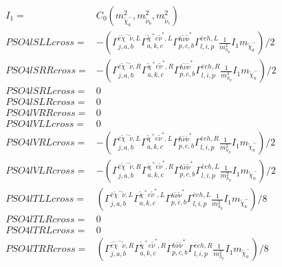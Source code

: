 \documentclass[A4,landscape]{article}
\begin{document}
\begin{align} 
I_1= & C_0(m^2_{\tilde{\chi}^-_{{a}}}, m^2_{\tilde{\nu}_{{b}}}, m^2_{\tilde{\nu}_{{c}}}) \\ 
  PSO4lSLLcross= & -( \Gamma^{\bar{e}\tilde{\chi}^- \tilde{\nu} ,L}_{j, a, b} \Gamma^{\tilde{\chi}^+e \tilde{\nu}^*,L}_{a, k, c} \Gamma^{h \tilde{\nu} \tilde{\nu}^*}_{p, c, b} \Gamma^{\bar{e}e h ,L}_{l, i, p} \frac{1}{m^2_{h_{{p}}}} I_1 m_{\tilde{\chi}^-_{{a}}})/2 \\ 
  PSO4lSRRcross= & -( \Gamma^{\bar{e}\tilde{\chi}^- \tilde{\nu} ,R}_{j, a, b} \Gamma^{\tilde{\chi}^+e \tilde{\nu}^*,R}_{a, k, c} \Gamma^{h \tilde{\nu} \tilde{\nu}^*}_{p, c, b} \Gamma^{\bar{e}e h ,R}_{l, i, p} \frac{1}{m^2_{h_{{p}}}} I_1 m_{\tilde{\chi}^-_{{a}}})/2 \\ 
  PSO4lSRLcross= & 0 \\ 
  PSO4lSLRcross= & 0 \\ 
  PSO4lVRRcross= & 0 \\ 
  PSO4lVLLcross= & 0 \\ 
  PSO4lVRLcross= & -( \Gamma^{\bar{e}\tilde{\chi}^- \tilde{\nu} ,L}_{j, a, b} \Gamma^{\tilde{\chi}^+e \tilde{\nu}^*,L}_{a, k, c} \Gamma^{h \tilde{\nu} \tilde{\nu}^*}_{p, c, b} \Gamma^{\bar{e}e h ,R}_{l, i, p} \frac{1}{m^2_{h_{{p}}}} I_1 m_{\tilde{\chi}^-_{{a}}})/2 \\ 
  PSO4lVLRcross= & -( \Gamma^{\bar{e}\tilde{\chi}^- \tilde{\nu} ,R}_{j, a, b} \Gamma^{\tilde{\chi}^+e \tilde{\nu}^*,R}_{a, k, c} \Gamma^{h \tilde{\nu} \tilde{\nu}^*}_{p, c, b} \Gamma^{\bar{e}e h ,L}_{l, i, p} \frac{1}{m^2_{h_{{p}}}} I_1 m_{\tilde{\chi}^-_{{a}}})/2 \\ 
  PSO4lTLLcross= & ( \Gamma^{\bar{e}\tilde{\chi}^- \tilde{\nu} ,L}_{j, a, b} \Gamma^{\tilde{\chi}^+e \tilde{\nu}^*,L}_{a, k, c} \Gamma^{h \tilde{\nu} \tilde{\nu}^*}_{p, c, b} \Gamma^{\bar{e}e h ,L}_{l, i, p} \frac{1}{m^2_{h_{{p}}}} I_1 m_{\tilde{\chi}^-_{{a}}})/8 \\ 
  PSO4lTLRcross= & 0 \\ 
  PSO4lTRLcross= & 0 \\ 
  PSO4lTRRcross= & ( \Gamma^{\bar{e}\tilde{\chi}^- \tilde{\nu} ,R}_{j, a, b} \Gamma^{\tilde{\chi}^+e \tilde{\nu}^*,R}_{a, k, c} \Gamma^{h \tilde{\nu} \tilde{\nu}^*}_{p, c, b} \Gamma^{\bar{e}e h ,R}_{l, i, p} \frac{1}{m^2_{h_{{p}}}} I_1 m_{\tilde{\chi}^-_{{a}}})/8 \\ 
\end{align} 
\end{document}
